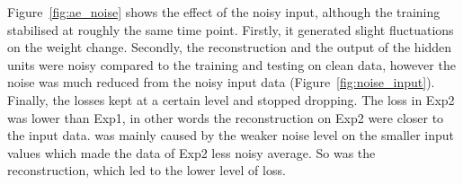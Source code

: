 Figure~\ref{fig:ae_noise} shows the effect of the noisy input, although the training stabilised at roughly the same time point.
Firstly, it generated slight fluctuations on the weight change.
Secondly, the reconstruction and the output of the hidden units were noisy compared to the training and testing on clean data, however the noise was much reduced from the noisy input data (Figure~\ref{fig:noise_input}). 
Finally, the losses kept at a certain level and stopped dropping.
The loss in Exp2 was lower than Exp1, in other words the reconstruction on Exp2 were closer to the input data.
\DIFdelbegin {}\DIFdelend \DIFaddbegin {}\DIFaddend was mainly caused by the weaker noise level on the smaller input values which made the data of Exp2 less noisy \DIFdelbegin {}\DIFdelend \DIFaddbegin {}\DIFaddend average.
So was the reconstruction, which led to the lower level of loss.
